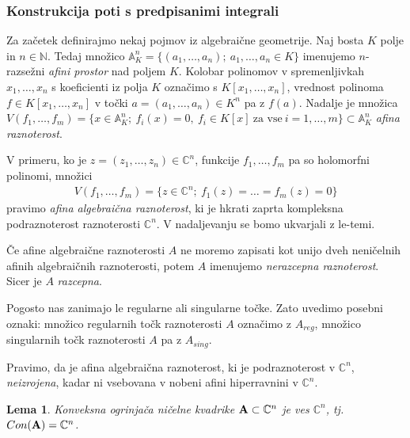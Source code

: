 \documentclass[12pt,a4paper,twoside]{article}
\theoremstyle{definition} %
\theoremstyle{plain} %
\newtheorem{lema}[definicija]{Lema}
\numberwithin{equation}{section}  %
\newcommand{\C}{\mathbb C}
\begin{document}
\subsubsection{Konstrukcija poti s predpisanimi integrali}
%
Za začetek definirajmo nekaj pojmov iz algebraične geometrije. \newline
Naj bosta $K$ polje in $n \in \mathbb{N}$. Tedaj množico $\mathbb{A}_{K}^{n} = \{ (a_{1}, \dots , a_{n}); \ a_{1}, \dots , a_{n} \in K \}$ imenujemo $n$-razsežni \emph{afini prostor} nad poljem $K$.
Kolobar polinomov v spremenljivkah $x_{1}, \dots , x_{n}$ s koeficienti iz polja $K$ označimo s $K[x_{1}, \dots , x_{n}]$, vrednost polinoma $f \in K[x_{1}, \dots , x_{n}]$ v točki $a = (a_{1}, \dots , a_{n}) \in K^{n}$ pa z $f(a)$.
Nadalje je množica $V(f_{1}, \dots , f_{m}) = \{ x \in \mathbb{A}_{K}^{n} ; \ f_{i}(x) = 0, \ f_{i} \in K[x] \ \textrm{za vse} \ i = 1, \dots , m \} \subset \mathbb{A}_{K}^{n}$ \emph{afina raznoterost}.

V primeru, ko je $z = (z_{1}, \dots , z_{n}) \in \mathbb{C}^{n}$, funkcije $f_{1}, \dots , f_{m}$ pa so holomorfni polinomi, množici
\begin{gather}
V(f_{1}, \dots , f_{m}) = \{ z \in \mathbb{C}^{n}; \ f_{1}(z) = \dots = f_{m}(z) = 0 \}
\end{gather}
pravimo \emph{afina algebraična raznoterost}, ki je hkrati zaprta kompleksna podraznoterost raznoterosti $\mathbb{C}^{n}$.
V nadaljevanju se bomo ukvarjali z le-temi.

Če afine algebraične raznoterosti $A$ ne moremo zapisati kot unijo dveh neničelnih afinih algebraičnih raznoterosti, potem $A$ imenujemo \emph{nerazcepna raznoterost}.
Sicer je $A$ \emph{razcepna}.

Pogosto nas zanimajo le regularne ali singularne točke. Zato uvedimo posebni oznaki:
množico regularnih točk raznoterosti $A$ označimo z $A_{reg}$, množico singularnih točk raznoterosti $A$ pa z $A_{sing}$.

Pravimo, da je afina algebraična raznoterost, ki je podraznoterost v $\mathbb{C}^{n}$, \emph{neizrojena}, kadar ni vsebovana v nobeni afini hiperravnini v $\mathbb{C}^{n}$.

\begin{lema}
Konveksna ogrinjača ničelne kvadrike $\textup{\textbf{A}} \subset \C^{n}$ je ves $\C^{n}$, tj.~$Con(\textup{\textbf{A}}) = \C^{n}$.
\end{lema}
\end{document}
